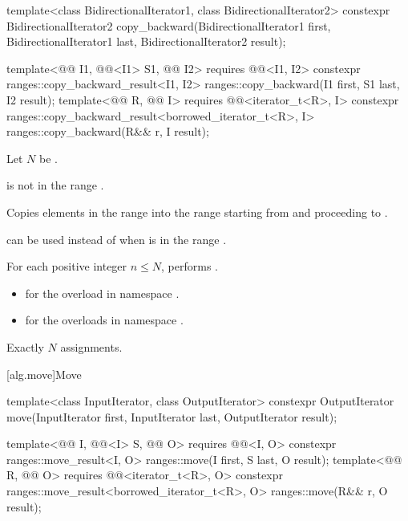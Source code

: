 %
\begin{itemdecl}
template<class BidirectionalIterator1, class BidirectionalIterator2>
  constexpr BidirectionalIterator2
    copy_backward(BidirectionalIterator1 first,
                  BidirectionalIterator1 last,
                  BidirectionalIterator2 result);

template<@@ I1, @@<I1> S1, @@ I2>
  requires @@<I1, I2>
  constexpr ranges::copy_backward_result<I1, I2>
    ranges::copy_backward(I1 first, S1 last, I2 result);
template<@@ R, @@ I>
  requires @@<iterator_t<R>, I>
  constexpr ranges::copy_backward_result<borrowed_iterator_t<R>, I>
    ranges::copy_backward(R&& r, I result);
\end{itemdecl}

\begin{itemdescr}
\pnum
Let $N$ be .

\pnum
\expects
{} is not in the range .

\pnum
\effects
Copies elements in the range 
into the range 
starting from  and proceeding to .
\begin{footnote}
 can be used instead of 
when  is in the range .
\end{footnote}
For each positive integer $n \le N$,
performs .

\pnum
\returns
\begin{itemize}
\item
  for the overload in namespace .
\item
  for the overloads in namespace .
\end{itemize}

\pnum
\complexity
Exactly $N$ assignments.
\end{itemdescr}

[alg.move]{Move}

%
\begin{itemdecl}
template<class InputIterator, class OutputIterator>
  constexpr OutputIterator move(InputIterator first, InputIterator last,
                                OutputIterator result);

template<@@ I, @@<I> S, @@ O>
  requires @@<I, O>
  constexpr ranges::move_result<I, O>
    ranges::move(I first, S last, O result);
template<@@ R, @@ O>
  requires @@<iterator_t<R>, O>
  constexpr ranges::move_result<borrowed_iterator_t<R>, O>
    ranges::move(R&& r, O result);
\end{itemdecl}

